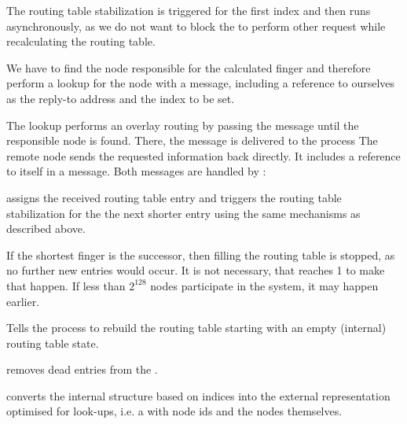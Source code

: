 The routing table stabilization is triggered for the first index and
then runs asynchronously, as we do not want to block the
 to perform other request while recalculating the
routing table.

We have to find the node responsible for the calculated finger and therefore
perform a lookup for the node with a  message, including
a reference to ourselves as the reply-to address and the index to be set.

The lookup performs an overlay routing by passing the message until
the responsible node is found. There, the message is delivered to the
 process
The remote node sends the requested information back directly. It includes a
reference to itself in a  message. Both messages
are handled by :


 assigns the received routing table entry and triggers the
routing table stabilization for the the next shorter entry using the same
mechanisms as described above.

If the shortest finger is the successor, then filling the routing table is
stopped, as no further new entries would occur. It is not necessary, that
 reaches 1 to make that happen. If less than $2^{128}$ nodes
participate in the system, it may happen earlier.

Tells the  process to rebuild the routing table starting
with an empty (internal) routing table state.

 removes dead entries from the .

 converts the internal  structure
based on indices into the external representation optimised for look-ups, i.e.
a  with node ids and the nodes themselves.

